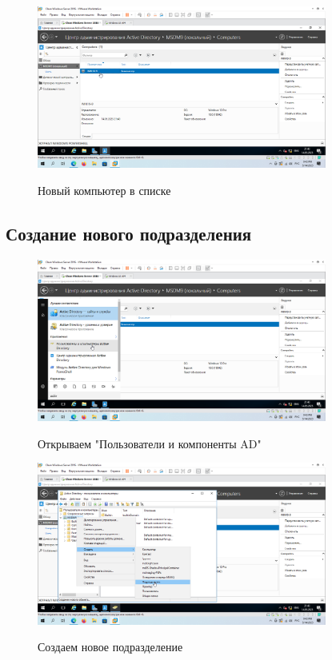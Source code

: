 \documentclass[a4paper]{article}
\begin{document}
  \begin{figure}[H]
    \centering
    \includegraphics[width=0.85\textwidth]{5_0098}
    \label{img:98}
    \caption{Новый компьютер в списке}
  \end{figure}

  \subsection{Создание нового подразделения}
  \begin{figure}[H]
    \centering
    \includegraphics[width=0.85\textwidth]{5_0099}
    \label{img:99}
    \caption{Открываем "Пользователи и компоненты AD"}
  \end{figure}

  \begin{figure}[H]
    \centering
    \includegraphics[width=0.85\textwidth]{5_0100}
    \label{img:100}
    \caption{Создаем новое подразделение}
  \end{figure}
\end{document}
